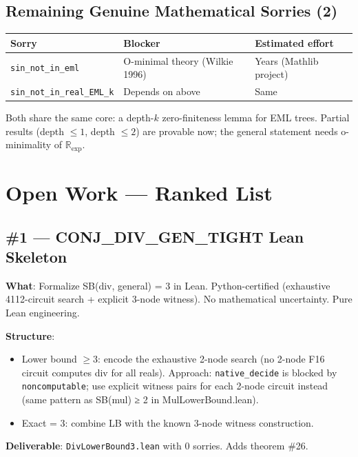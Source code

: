 \documentclass[12pt]{article}
\theoremstyle{definition}
\begin{document}
\subsection{Remaining Genuine Mathematical Sorries (2)}

\begin{center}
\begin{tabular}{lll}
\toprule
Sorry & Blocker & Estimated effort \\
\midrule
\texttt{sin\_not\_in\_eml} & O-minimal theory (Wilkie 1996) & Years (Mathlib project) \\
\texttt{sin\_not\_in\_real\_EML\_k} & Depends on above & Same \\
\bottomrule
\end{tabular}
\end{center}

Both share the same core: a depth-$k$ zero-finiteness lemma for EML trees.
Partial results (depth $\leq 1$, depth $\leq 2$) are provable now; the general
statement needs o-minimality of $\mathbb{R}_{\exp}$.

\section{Open Work — Ranked List}

\subsection{\textcolor{high}{\#1 — CONJ\_DIV\_GEN\_TIGHT Lean Skeleton}}

\textbf{What}: Formalize SB(div, general) = 3 in Lean.
Python-certified (exhaustive 4112-circuit search + explicit 3-node witness).
No mathematical uncertainty. Pure Lean engineering.

\textbf{Structure}:
\begin{itemize}[noitemsep]
  \item Lower bound $\geq 3$: encode the exhaustive 2-node search (no 2-node F16 circuit computes div for all reals). Approach: \texttt{native\_decide} is blocked by \texttt{noncomputable}; use explicit witness pairs for each 2-node circuit instead (same pattern as SB(mul) ≥ 2 in MulLowerBound.lean).
  \item Exact = 3: combine LB with the known 3-node witness construction.
\end{itemize}

\textbf{Deliverable}: \texttt{DivLowerBound3.lean} with 0 sorries. Adds theorem \#26.
\end{document}
